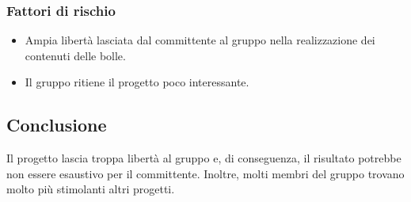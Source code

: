 		\subsubsection {Fattori di rischio}
			\begin{itemize}
				\item Ampia libertà lasciata dal committente al gruppo nella realizzazione dei contenuti delle bolle.		
				\item Il gruppo ritiene il progetto poco interessante.
			\end{itemize}
	\subsection {Conclusione}
		Il progetto lascia troppa libertà al gruppo e, di conseguenza, il risultato potrebbe non essere esaustivo per il committente. Inoltre, molti membri del gruppo trovano molto più stimolanti altri progetti.
	